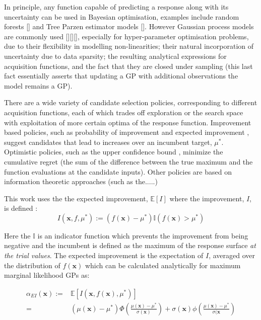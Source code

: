 In principle, any function capable of predicting a response along with its uncertainty can be used in Bayesian optimisation, examples include random forests [] and Tree Parzen estimator models []. However Gaussian process models are commonly used [][][], especially for hyper-parameter optimisation problems\cite{bergstraAlgorithmsHyperParameterOptimizationa}\cite{martinez-cantinBayesOptBayesianOptimization2014}, due to their flexibility in modelling non-linearities; their natural incorporation of uncertainty due to data sparsity; the resulting analytical expressions for acquisition functions, and the fact that they are closed under sampling \cite{NIPS2012_4522}\cite{brochuTutorialBayesianOptimization2010} (this last fact essentially asserts that updating a GP with additional observations the model remains a GP). 

There are a wide variety of candidate selection policies, corresponding to different acquisition functions, each of which trades off exploration or the search space with exploitation of more certain optima of the response function. Improvement based policies, such as probability of improvement \cite{Kushner1963} and expected improvement \cite{mockus1978application}, suggest candidates that lead to increases over an incumbent target, $\mu^{*}$.  Optimistic policies, such as the upper confidence bound \cite{icml2010_129}, minimize the cumulative regret (the sum of the difference between the true maximum and the function evaluations at the candidate inputs). Other policies are based on information theoretic approaches (such as the.....) 

This work uses the the expected improvement, $\mathbb{E}[I]$ where the improvement, $I$, is defined :  
\begin{equation}
    I(\mathbf{x}, f, \mu^{*}):=(f(\mathbf{x}) - \mu^{*}) \mathbb{I}(f(\mathbf{x}) > \mu^{*})
\end{equation}

Here the $\mathbb{I}$ is an indicator function which prevents the improvement from being negative and the incumbent is defined as the maximum of the response surface \emph{at the trial values}. The expected improvement is the expectation of $I$, averaged over the distribution of $f(\mathbf{x})$ which can be calculated analytically for maximum marginal likelihood GPs as: 

\begin{align}
        \alpha_{EI}(\mathbf{x}) := &  \mathbb{E}\left[I(\mathbf{x}, f(\mathbf{x}), \mu^{*})\right] \\
         =  &(\mu(\mathbf{x}) - \mu^{*})\Phi\left( \frac{ \mu(\mathbf{x}) - \mu^{*} }{\sigma(\mathbf{x})} \right ) + \sigma(\mathbf{x})\phi\left( \frac{ \mu(\mathbf{x}) - \mu^{*} }{\sigma(\mathbf{x} } \right )
\end{align}

